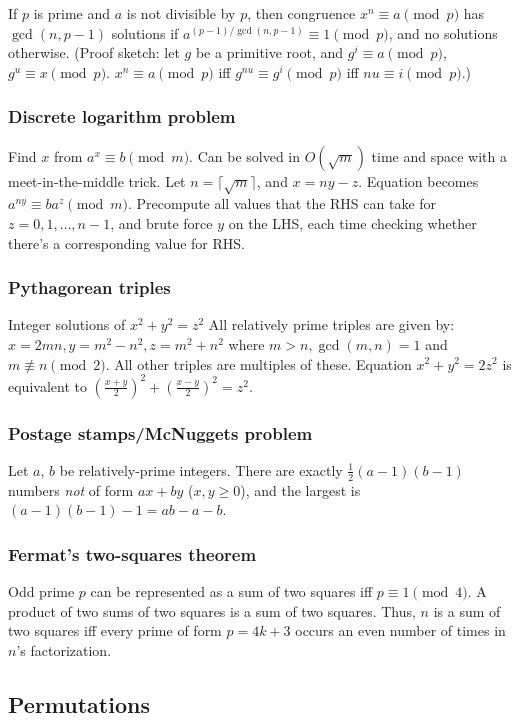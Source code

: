 If $p$ is prime and $a$ is not divisible by $p$, then congruence
$x^n \equiv a \pmod{p}$ has $\gcd(n, p-1)$ solutions if
$a^{(p-1)/\gcd(n,p-1)} \equiv 1 \pmod{p}$, and no solutions otherwise.
(Proof sketch: let $g$ be a primitive root, and
$g^i \equiv a \pmod{p}$, $g^u \equiv x \pmod{p}$.
$x^n \equiv a \pmod{p}$ iff $g^{nu} \equiv g^i \pmod{p}$ iff $nu \equiv i \pmod{p}$.)

\subsubsection{Discrete logarithm problem}  Find $x$ from $a^x \equiv b \pmod{m}$.
Can be solved in $O(\sqrt{m})$ time and space with a meet-in-the-middle trick.
Let $n = \lceil \sqrt{m} \rceil$, and $x = ny - z$.
Equation becomes $a^{ny} \equiv b a^z \pmod{m}$.  Precompute all values that
the RHS can take for $z = 0, 1, \dots, n-1$, and brute force $y$ on the LHS,
each time checking whether there's a corresponding value for RHS.

\subsubsection{Pythagorean triples}  Integer solutions of $x^2 + y^2 = z^2$
All relatively prime triples are given by:
$x=2mn, y=m^2-n^2, z=m^2+n^2$ where $m>n, \gcd(m,n)=1$ and $m \not\equiv n \pmod{2}$.
All other triples are multiples of these.
Equation $x^2 + y^2 = 2z^2$ is equivalent to $(\frac{x+y}{2})^2 + (\frac{x-y}{2})^2 = z^2$.

\subsubsection{Postage stamps/McNuggets problem}  Let $a$, $b$ be relatively-prime integers.
There are exactly $\frac{1}{2}(a-1)(b-1)$ numbers \emph{not} of form $ax+by$ ($x,y \ge 0$),
and the largest is $(a-1)(b-1)-1 = ab - a - b$.

\subsubsection{Fermat's two-squares theorem}  Odd prime $p$ can be represented
as a sum of two squares iff $p \equiv 1 {\pmod 4}$.
A product of two sums of two squares is a sum of two squares.
Thus, $n$ is a sum of two squares iff every prime of
form $p=4k+3$ occurs an even number of times in $n$'s factorization.


\subsection{Permutations}
